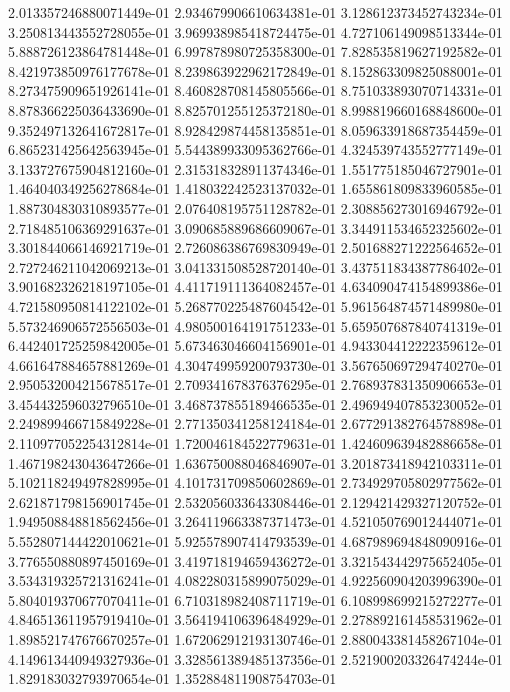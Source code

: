 2.013357246880071449e-01
2.934679906610634381e-01
3.128612373452743234e-01
3.250813443552728055e-01
3.969938985418724475e-01
4.727106149098513344e-01
5.888726123864781448e-01
6.997878980725358300e-01
7.828535819627192582e-01
8.421973850976177678e-01
8.239863922962172849e-01
8.152863309825088001e-01
8.273475909651926141e-01
8.460828708145805566e-01
8.751033893070714331e-01
8.878366225036433690e-01
8.825701255125372180e-01
8.998819660168848600e-01
9.352497132641672817e-01
8.928429874458135851e-01
8.059633918687354459e-01
6.865231425642563945e-01
5.544389933095362766e-01
4.324539743552777149e-01
3.133727675904812160e-01
2.315318328911374346e-01
1.551775185046727901e-01
1.464040349256278684e-01
1.418032242523137032e-01
1.655861809833960585e-01
1.887304830310893577e-01
2.076408195751128782e-01
2.308856273016946792e-01
2.718485106369291637e-01
3.090685889686609067e-01
3.344911534652325602e-01
3.301844066146921719e-01
2.726086386769830949e-01
2.501688271222564652e-01
2.727246211042069213e-01
3.041331508528720140e-01
3.437511834387786402e-01
3.901682326218197105e-01
4.411719111364082457e-01
4.634090474154899386e-01
4.721580950814122102e-01
5.268770225487604542e-01
5.961564874571489980e-01
5.573246906572556503e-01
4.980500164191751233e-01
5.659507687840741319e-01
6.442401725259842005e-01
5.673463046604156901e-01
4.943304412222359612e-01
4.661647884657881269e-01
4.304749959200793730e-01
3.567650697294740270e-01
2.950532004215678517e-01
2.709341678376376295e-01
2.768937831350906653e-01
3.454432596032796510e-01
3.468737855189466535e-01
2.496949407853230052e-01
2.249899466715849228e-01
2.771350341258124184e-01
2.677291382764578898e-01
2.110977052254312814e-01
1.720046184522779631e-01
1.424609639482886658e-01
1.467198243043647266e-01
1.636750088046846907e-01
3.201873418942103311e-01
5.102118249497828995e-01
4.101731709850602869e-01
2.734929705802977562e-01
2.621871798156901745e-01
2.532056033643308446e-01
2.129421429327120752e-01
1.949508848818562456e-01
3.264119663387371473e-01
4.521050769012444071e-01
5.552807144422010621e-01
5.925578907414793539e-01
4.687989694848090916e-01
3.776550880897450169e-01
3.419718194659436272e-01
3.321543442975652405e-01
3.534319325721316241e-01
4.082280315899075029e-01
4.922560904203996390e-01
5.804019370677070411e-01
6.710318982408711719e-01
6.108998699215272277e-01
4.846513611957919410e-01
3.564194106396484929e-01
2.278892161458531962e-01
1.898521747676670257e-01
1.672062912193130746e-01
2.880043381458267104e-01
4.149613440949327936e-01
3.328561389485137356e-01
2.521900203326474244e-01
1.829183032793970654e-01
1.352884811908754703e-01
